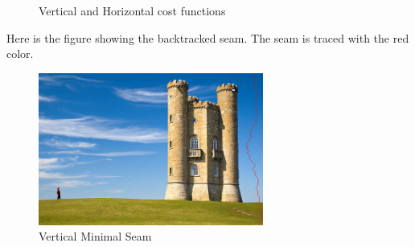 \documentclass[a4paper, nobib]{tufte-handout}
\begin{document}
\begin{enumerate}
  \begin{figure}[ht!]
\hfill
\caption{Vertical and Horizontal cost  functions}
\label{fig:costs}
\end{figure}

Here is the figure showing the backtracked seam. The seam is traced with the red
color.

\begin{figure}[htpb]
  \centering
  \includegraphics[width=0.8\linewidth,height=5cm]{"./vseam.png"}
  \caption{Vertical Minimal Seam}%
  \label{fig:v_seam}
\end{figure}



\end{enumerate}
\end{document}
